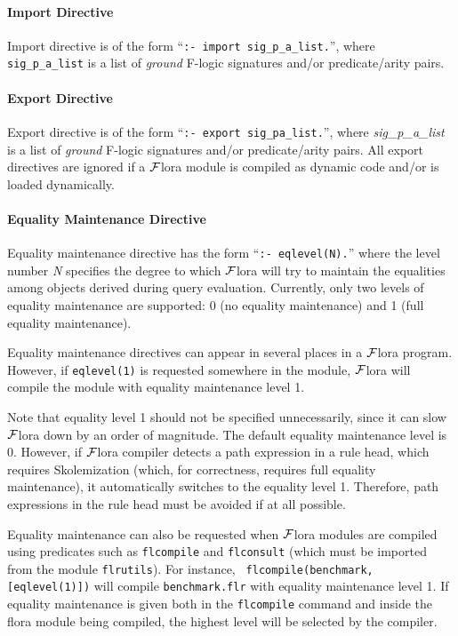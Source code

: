 \documentclass[11pt]{article}
\newcommand{\FLORA}{{\mbox{${\cal F}${\sc lora}}}\xspace}
\newcommand{\fl}{{F-logic}\xspace}
\begin{document}
\paragraph{Import Directive} Import directive is of the form
``{\tt :- import sig\_p\_a\_list.}'', where {\tt sig\_p\_a\_list} is a
list of \emph{ground} \fl signatures \mbox{and/or} \mbox{predicate/arity}
pairs.

\paragraph{Export Directive} Export directive is of the form
``{\tt :- export sig\_pa\_list.}'', where \emph{sig\_p\_a\_list} is a list of
\emph{ground} \fl signatures \mbox{and/or} \mbox{predicate/arity} pairs.
All export directives are ignored if a \FLORA module is compiled as dynamic
code and/or is loaded dynamically.

\paragraph{Equality Maintenance Directive} Equality maintenance directive has
the form ``{\tt :- eqlevel(N).}''  where the level number \emph{N}
specifies the degree to which \FLORA will try to maintain the equalities
among objects derived during query evaluation. Currently, only two levels
of equality maintenance are supported: 0 (no equality maintenance) and 1
(full equality maintenance).

Equality maintenance directives can appear in several places in a \FLORA
program. However, if  {\tt eqlevel(1)} is requested somewhere in the
module, \FLORA will compile the module with equality maintenance
level 1.

Note that equality level 1 should not be specified unnecessarily, since it
can slow \FLORA down by an order of magnitude.  The default equality
maintenance level is 0. However, if \FLORA compiler detects a path
expression in a rule head, which requires Skolemization (which, for
correctness, requires full equality maintenance), it automatically switches
to the equality level 1.  Therefore, path expressions in the rule head must
be avoided if at all possible.

Equality maintenance can also be requested when \FLORA modules are compiled
using predicates such as {\tt flcompile} and {\tt flconsult} (which must be
imported from the module {\tt flrutils}).  For instance, {\tt
  flcompile(benchmark,[eqlevel(1)])} will compile {\tt benchmark.flr} with
equality maintenance level 1.  If equality maintenance is given both in the
{\tt flcompile} command and inside the flora module being compiled, the
highest level will be selected by the compiler.
\end{document}
